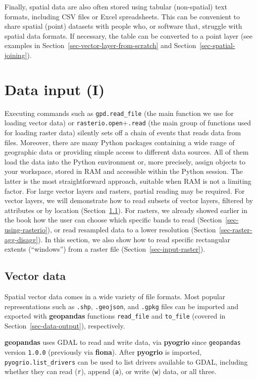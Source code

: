 \documentclass[
  letterpaper,
]{krantz}
\begin{document}
Finally, spatial data are also often stored using tabular (non-spatial)
text formats, including CSV files or Excel spreadsheets. This can be
convenient to share spatial (point) datasets with people who, or
software that, struggle with spatial data formats. If necessary, the
table can be converted to a point layer (see examples in
Section~\ref{sec-vector-layer-from-scratch} and
Section~\ref{sec-spatial-joining}).

\section{Data input (I)}\label{sec-data-input}

Executing commands such as \texttt{gpd.read\_file} (the main function we
use for loading vector data) or \texttt{rasterio.open}+\texttt{.read}
(the main group of functions used for loading raster data) silently sets
off a chain of events that reads data from files. Moreover, there are
many Python packages containing a wide range of geographic data or
providing simple access to different data sources. All of them load the
data into the Python environment or, more precisely, assign objects to
your workspace, stored in RAM and accessible within the Python session.
The latter is the most straightforward approach, suitable when RAM is
not a limiting factor. For large vector layers and rasters, partial
reading may be required. For vector layers, we will demonstrate how to
read subsets of vector layers, filtered by attributes or by location
(Section~\ref{sec-input-vector}). For rasters, we already showed earlier
in the book how the user can choose which specific bands to read
(Section~\ref{sec-using-rasterio}), or read resampled data to a lower
resolution (Section~\ref{sec-raster-agg-disagg}). In this section, we
also show how to read specific rectangular extents (``windows'') from a
raster file (Section~\ref{sec-input-raster}).

\subsection{Vector data}\label{sec-input-vector}

Spatial vector data comes in a wide variety of file formats. Most
popular representations such as \texttt{.shp}, \texttt{.geojson}, and
\texttt{.gpkg} files can be imported and exported with
\textbf{geopandas} functions \texttt{read\_file} and \texttt{to\_file}
(covered in Section~\ref{sec-data-output}), respectively.

\textbf{geopandas} uses GDAL to read and write data, via
\textbf{pyogrio} since \texttt{geopandas} version \texttt{1.0.0}
(previously via \textbf{fiona}). After \textbf{pyogrio} is imported,
\texttt{pyogrio.list\_drivers} can be used to list drivers available to
GDAL, including whether they can read
(\texttt{\textquotesingle{}r\textquotesingle{}}), append
(\texttt{\textquotesingle{}a\textquotesingle{}}), or write
(\texttt{\textquotesingle{}w\textquotesingle{}}) data, or all three.
\end{document}

